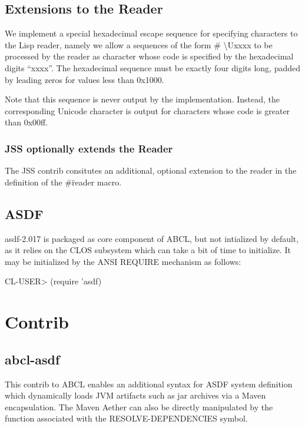 \documentclass[10pt]{book}
\begin{document}
\section{Extensions to the Reader}

We implement a special hexadecimal escape sequence for specifying
characters to the Lisp reader, namely we allow a sequences of the form
\# \textbackslash Uxxxx to be processed by the reader as character whose code is
specified by the hexadecimal digits ``xxxx''.  The hexadecimal sequence
must be exactly four digits long, padded by leading zeros for values
less than 0x1000.

Note that this sequence is never output by the implementation.  Instead,
the corresponding Unicode character is output for characters whose
code is greater than 0x00ff.

\subsection{JSS optionally extends the Reader}

The JSS contrib consitutes an additional, optional extension to the
reader in the definition of the \#\" reader macro.

\section{ASDF}

asdf-2.017 is packaged as core component of ABCL, but not intialized
by default, as it relies on the CLOS subsystem which can take a bit of
time to initialize.  It may be initialized by the ANSI
\textsc{REQUIRE} mechanism as follows:

\begin{listing-lisp}
CL-USER> (require 'asdf)
\end{listing-lisp}

\chapter{Contrib}

\section{abcl-asdf}

This contrib to ABCL enables an additional syntax for ASDF system
definition which dynamically loads JVM artifacts such as jar archives
via a Maven encapsulation.  The Maven Aether can also be directly
manipulated by the function associated with the RESOLVE-DEPENDENCIES symbol.
\end{document}
